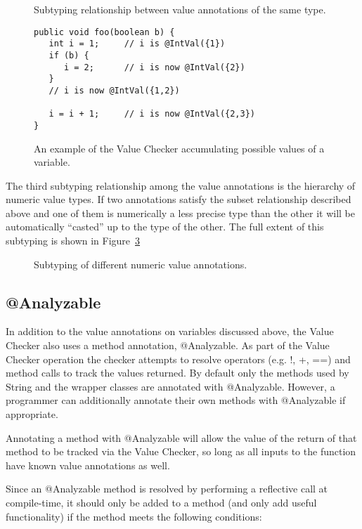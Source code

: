 \begin{figure}
\caption{Subtyping relationship between value annotations of the same type.}
\label{fig-value-subtype}
\end{figure}

\begin{figure}
\begin{Verbatim}
public void foo(boolean b) {
   int i = 1;     // i is @IntVal({1})
   if (b) {  
      i = 2;      // i is now @IntVal({2})
   }        
   // i is now @IntVal({1,2})
   
   i = i + 1;     // i is now @IntVal({2,3})
}
\end{Verbatim}
\caption{An example of the Value Checker accumulating possible values
    of a variable.}
\label{fig-value-multivalue}
\end{figure}

The third subtyping relationship among the value annotations is the
hierarchy of numeric value types. If two annotations satisfy the
subset relationship described above and one of them is numerically a
less precise type than the other it will be automatically ``casted''
up to the type of the other. The full extent of this subtyping is
shown in Figure~\ref{fig-value-subtyping}

\begin{figure}
\caption{Subtyping of different numeric value annotations.}
\label{fig-value-subtyping}
\end{figure}

\subsection{@Analyzable}
In addition to the value annotations on variables discussed above,
the Value Checker also uses a method annotation,
@Analyzable. As part of the Value Checker operation the checker
attempts to resolve operators (e.g. !, +, ==) and method calls to
track the values returned. By default only the methods used by String
and the wrapper classes are annotated with @Analyzable. However, a
programmer can additionally annotate their own methods with
@Analyzable if appropriate.

Annotating a method with @Analyzable will allow the value of the
return of that method to be tracked via the Value Checker, so long as
all inputs to the function have known value annotations as well.

Since an @Analyzable method is resolved by performing a reflective
call at compile-time, it should only be added to a method (and only
add useful functionality) if the method meets the following
conditions:

